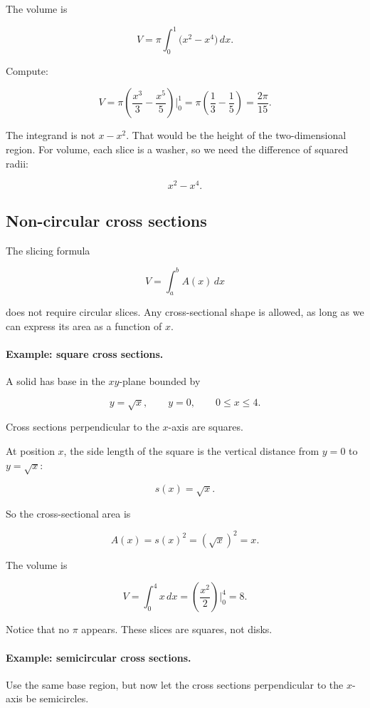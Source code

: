 The volume is

\[
V
=
\pi\int_0^1 \bigl(x^2-x^4\bigr)\,dx.
\]

Compute:

\[
V
=
\pi\left(\frac{x^3}{3}-\frac{x^5}{5}\right)\Big|_0^1
=
\pi\left(\frac13-\frac15\right)
=
\boxed{\frac{2\pi}{15}}.
\]

The integrand is not \(x-x^2\).  That would be the height of the two-dimensional
region.  For volume, each slice is a washer, so we need the difference of squared radii:

\[
x^2-x^4.
\]

\subsection{Non-circular cross sections}
\label{subsec:non-circular-cross-sections}

The slicing formula

\[
V=\int_a^b A(x)\,dx
\]

does not require circular slices.  Any cross-sectional shape is allowed, as long as we
can express its area as a function of \(x\).

\paragraph{Example: square cross sections.}
A solid has base in the \(xy\)-plane bounded by

\[
y=\sqrt{x},
\qquad
y=0,
\qquad
0\le x\le4.
\]

Cross sections perpendicular to the \(x\)-axis are squares.

At position \(x\), the side length of the square is the vertical distance from \(y=0\) to
\(y=\sqrt{x}\):

\[
s(x)=\sqrt{x}.
\]

So the cross-sectional area is

\[
A(x)=s(x)^2=(\sqrt{x})^2=x.
\]

The volume is

\[
V=\int_0^4 x\,dx
=
\left(\frac{x^2}{2}\right)\Big|_0^4
=
\boxed{8}.
\]

Notice that no \(\pi\) appears.  These slices are squares, not disks.

\paragraph{Example: semicircular cross sections.}
Use the same base region, but now let the cross sections perpendicular to the \(x\)-axis
be semicircles.

